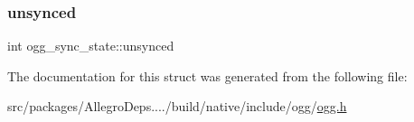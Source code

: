 \mbox{\label{structogg__sync__state_a8d538bb32400470f00080e2160158a76}} 
\subsubsection{\texorpdfstring{unsynced}{unsynced}}
{\footnotesize\ttfamily int ogg\+\_\+sync\+\_\+state\+::unsynced}



The documentation for this struct was generated from the following file\+:\begin{DoxyCompactItemize}
\item 
src/packages/\+Allegro\+Deps..../build/native/include/ogg/\hyperlink{ogg_8h}{ogg.\+h}\end{DoxyCompactItemize}
